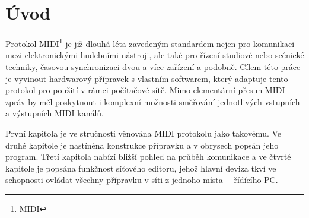 {}
\chapter*{Úvod}

Protokol \acs{MIDI}\footnote{\acl{MIDI}} je již dlouhá léta zavedeným standardem nejen pro komunikaci mezi elektronickými hudebními nástroji, ale také pro řízení studiové nebo scénické techniky, časovou synchronizaci dvou a více zařízení a podobně. Cílem této práce je vyvinout hardwarový přípravek s vlastním softwarem, který adaptuje tento protokol pro použití v rámci počítačové sítě. Mimo elementární přesun \acs{MIDI} zpráv by měl poskytnout i komplexní možnosti směřování jednotlivých vstupních a výstupních \acs{MIDI} kanálů.

První kapitola je ve stručnosti věnována \acs{MIDI} protokolu jako takovému. Ve druhé kapitole je nastíněna konstrukce přípravku a v obrysech popsán jeho program. Třetí kapitola nabízí bližší pohled na průběh komunikace a ve čtvrté kapitole je popsána funkčnost síťového editoru, jehož hlavní deviza tkví ve schopnosti ovládat všechny přípravku v síti z jednoho místa~-- řídícího PC.
